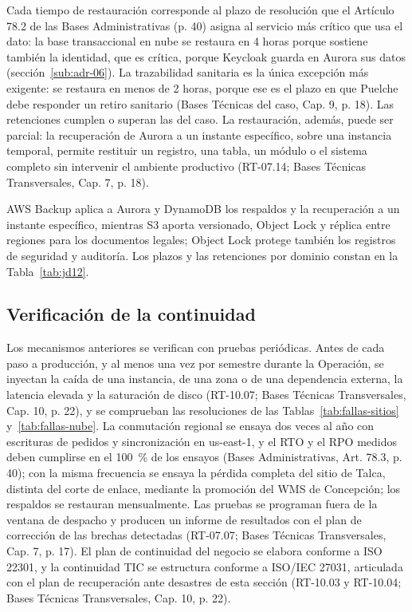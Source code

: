 Cada tiempo de restauración corresponde al plazo de resolución que el Artículo 78.2 de las Bases Administrativas (p. 40) asigna al servicio más crítico que usa el dato: la base transaccional en nube se restaura en 4 horas porque sostiene también la identidad, que es crítica, porque Keycloak guarda en Aurora sus datos (sección~\ref{sub:adr-06}). La trazabilidad sanitaria es la única excepción más exigente: se restaura en menos de 2 horas, porque ese es el plazo en que Puelche debe responder un retiro sanitario (Bases Técnicas del caso, Cap. 9, p. 18). Las retenciones cumplen o superan las del caso. La restauración, además, puede ser parcial: la recuperación de Aurora a un instante específico, sobre una instancia temporal, permite restituir un registro, una tabla, un módulo o el sistema completo sin intervenir el ambiente productivo (RT-07.14; Bases Técnicas Transversales, Cap. 7, p. 18).

AWS Backup aplica a Aurora y DynamoDB los respaldos y la recuperación a un instante específico, mientras S3 aporta versionado, Object Lock y réplica entre regiones para los documentos legales; Object Lock protege también los registros de seguridad y auditoría. Los plazos y las retenciones por dominio constan en la Tabla~\ref{tab:jd12}.

\subsection{Verificación de la continuidad}
\label{sub:6-verificacion-de-la-continuidad}

Los mecanismos anteriores se verifican con pruebas periódicas. Antes de cada paso a producción, y al menos una vez por semestre durante la Operación, se inyectan la caída de una instancia, de una zona o de una dependencia externa, la latencia elevada y la saturación de disco (RT-10.07; Bases Técnicas Transversales, Cap. 10, p. 22), y se comprueban las resoluciones de las Tablas~\ref{tab:fallas-sitios} y~\ref{tab:fallas-nube}. La conmutación regional se ensaya dos veces al año con escrituras de pedidos y sincronización en us-east-1, y el RTO y el RPO medidos deben cumplirse en el 100~\% de los ensayos (Bases Administrativas, Art. 78.3, p. 40); con la misma frecuencia se ensaya la pérdida completa del sitio de Talca, distinta del corte de enlace, mediante la promoción del WMS de Concepción; los respaldos se restauran mensualmente. Las pruebas se programan fuera de la ventana de despacho y producen un informe de resultados con el plan de corrección de las brechas detectadas (RT-07.07; Bases Técnicas Transversales, Cap. 7, p. 17). El plan de continuidad del negocio se elabora conforme a ISO 22301, y la continuidad TIC se estructura conforme a ISO/IEC 27031, articulada con el plan de recuperación ante desastres de esta sección (RT-10.03 y RT-10.04; Bases Técnicas Transversales, Cap. 10, p. 22).

